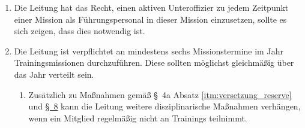 \begin{enumerate}[label=(\arabic*)]
    \item Die Leitung hat das Recht, einen aktiven Unteroffizier zu jedem Zeitpunkt einer Mission als Führungspersonal in dieser Mission einzusetzen, sollte es sich zeigen, dass dies notwendig ist.
    \item Die Leitung ist verpflichtet an mindestens sechs Missionstermine im Jahr Trainingsmissionen durchzuführen. Diese sollten möglichst gleichmäßig über das Jahr verteilt sein. 
       \begin{enumerate}[label=(\Alph*)]
        \item Zusätzlich zu Maßnahmen gem\"{a}{\ss} \S~4a Absatz \ref{itm:versetzung_reserve} und \hyperref[sec:umgang_mit_regelverstoeßen]{\S~8} kann die Leitung weitere disziplinarische Maßnahmen verh\"{a}ngen, wenn ein Mitglied regelm\"{a}{\ss}ig nicht an Trainings teilnimmt.
    \end{enumerate}    
\end{enumerate}
